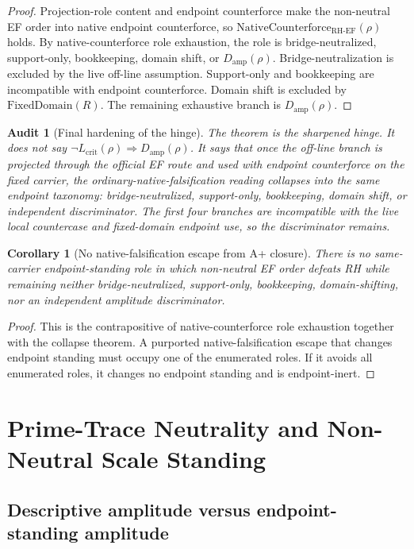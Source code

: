 \documentclass[11pt]{article}
\newtheorem{corollary}{Corollary}[section]
\newtheorem{audit}{Audit}[section]
\newcommand{\Lcrit}{L_{\mathrm{crit}}}
\newcommand{\RH}{\mathrm{RH}}
\newcommand{\EF}{\mathrm{EF}}
\newcommand{\FixedDomain}{\mathrm{FixedDomain}}
\newcommand{\Damp}{D_{\mathrm{amp}}}
\newcommand{\NativeCounterforce}{\mathrm{NativeCounterforce}}
\begin{document}
\begin{proof}
Projection-role content and endpoint counterforce make the non-neutral EF order into native endpoint counterforce, so \(\NativeCounterforce_{\RH\text{-}\EF}(\rho)\) holds.  By native-counterforce role exhaustion, the role is bridge-neutralized, support-only, bookkeeping, domain shift, or \(\Damp(\rho)\).  Bridge-neutralization is excluded by the live off-line assumption.  Support-only and bookkeeping are incompatible with endpoint counterforce.  Domain shift is excluded by \(\FixedDomain(R)\).  The remaining exhaustive branch is \(\Damp(\rho)\).
\end{proof}

\begin{audit}[Final hardening of the hinge]
The theorem is the sharpened hinge.  It does not say \(\neg\Lcrit(\rho)\Rightarrow\Damp(\rho)\).  It says that once the off-line branch is projected through the official EF route and used with endpoint counterforce on the fixed carrier, the ordinary-native-falsification reading collapses into the same endpoint taxonomy: bridge-neutralized, support-only, bookkeeping, domain shift, or independent discriminator.  The first four branches are incompatible with the live local countercase and fixed-domain endpoint use, so the discriminator remains.
\end{audit}

\begin{corollary}[No native-falsification escape from A+ closure]
There is no same-carrier endpoint-standing role in which non-neutral EF order defeats RH while remaining neither bridge-neutralized, support-only, bookkeeping, domain-shifting, nor an independent amplitude discriminator.
\end{corollary}

\begin{proof}
This is the contrapositive of native-counterforce role exhaustion together with the collapse theorem.  A purported native-falsification escape that changes endpoint standing must occupy one of the enumerated roles.  If it avoids all enumerated roles, it changes no endpoint standing and is endpoint-inert.
\end{proof}

\section{Prime-Trace Neutrality and Non-Neutral Scale Standing}

\subsection{Descriptive amplitude versus endpoint-standing amplitude}
\end{document}
